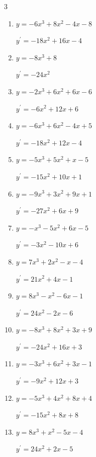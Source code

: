 \begin{multicols}{3}
\begin{enumerate}
  \item $y=-6x^{3}+8x^{2}-4x-8$

        $\displaystyle y^{\prime}=-18x^{2}+16x-4$

  \item $y=-8x^{3}+8$

        $\displaystyle y^{\prime}=-24x^{2}$

  \item $y=-2x^{3}+6x^{2}+6x-6$

        $\displaystyle y^{\prime}=-6x^{2}+12x+6$

  \item $y=-6x^{3}+6x^{2}-4x+5$

        $\displaystyle y^{\prime}=-18x^{2}+12x-4$

  \item $y=-5x^{3}+5x^{2}+x-5$

        $\displaystyle y^{\prime}=-15x^{2}+10x+1$

  \item $y=-9x^{3}+3x^{2}+9x+1$

        $\displaystyle y^{\prime}=-27x^{2}+6x+9$

  \item $y=-x^{3}-5x^{2}+6x-5$

        $\displaystyle y^{\prime}=-3x^{2}-10x+6$

  \item $y=7x^{3}+2x^{2}-x-4$

        $\displaystyle y^{\prime}=21x^{2}+4x-1$

  \item $y=8x^{3}-x^{2}-6x-1$

        $\displaystyle y^{\prime}=24x^{2}-2x-6$

  \item $y=-8x^{3}+8x^{2}+3x+9$

        $\displaystyle y^{\prime}=-24x^{2}+16x+3$

\columnbreak %

  \item $y=-3x^{3}+6x^{2}+3x-1$

        $\displaystyle y^{\prime}=-9x^{2}+12x+3$

  \item $y=-5x^{3}+4x^{2}+8x+4$

        $\displaystyle y^{\prime}=-15x^{2}+8x+8$

  \item $y=8x^{3}+x^{2}-5x-4$

        $\displaystyle y^{\prime}=24x^{2}+2x-5$


\end{enumerate}
\end{multicols}
